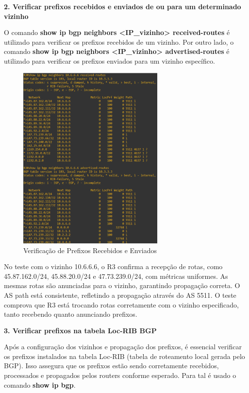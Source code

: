 \documentclass[11pt,english, openright, oneside]{book}
\begin{document}
\pagebreak
\textbf{2. Verificar prefixos recebidos e enviados de ou para um determinado vizinho} \par
O comando \textbf{show ip bgp neighbors <IP\_vizinho> received-routes} é utilizado para verificar os prefixos recebidos de um vizinho. Por outro lado, o comando \textbf{show ip bgp neighbors <IP\_vizinho> advertised-routes} é utilizado para verificar os prefixos enviados para um vizinho específico. \par
\begin{figure}[H]
  \centering
  \includegraphics[width=0.65\textwidth]{imagens/Tarefa2/6.bgp_R3.png}
  \caption{Verificação de Prefixos Recebidos e Enviados}
  \label{fig:tarefa2_teste2}
\end{figure}

No teste com o vizinho 10.6.6.6, o R3 confirma a recepção de rotas, como 45.87.162.0/24, 45.88.20.0/24 e 47.73.239.0/24, com métricas uniformes. As mesmas rotas são anunciadas para o vizinho, garantindo propagação correta. O AS path está consistente, refletindo a propagação através do AS 5511. O teste comprova que R3 está trocando rotas corretamente com o vizinho especificado, tanto recebendo quanto anunciando prefixos.


\pagebreak
\textbf{3. Verificar prefixos na tabela Loc-RIB BGP} \par
Após a configuração dos vizinhos e propagação dos prefixos, é essencial verificar os prefixos instalados na tabela Loc-RIB (tabela de roteamento local gerada pelo BGP). Isso assegura que os prefixos estão sendo corretamente recebidos, processados e propagados pelos routers conforme esperado. Para tal é usado o comando \textbf{show ip bgp}. \par
\end{document}
